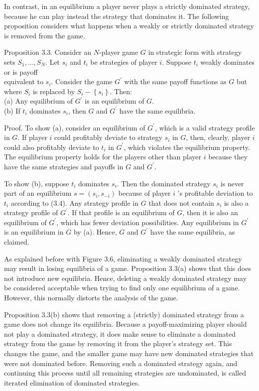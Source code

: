 \documentclass[12pt]{article}
\begin{document}
In contrast, in an equilibrium a player never plays a strictly dominated strategy, because he can play instead the strategy that dominates it. The following proposition considers what happens when a weakly or strictly dominated strategy is removed from the game.

Proposition 3.3. Consider an $N$-player game $G$ in strategic form with strategy sets $S_{1}, \ldots, S_{N}$. Let $s_{i}$ and $t_{i}$ be strategies of player $i$. Suppose $t_{i}$ weakly dominates or is payoff\\
equivalent to $s_{i}$. Consider the game $G^{\prime}$ with the same payoff functions as $G$ but where $S_{i}$ is replaced by $S_{i}-\left\{s_{i}\right\}$. Then:\\
(a) Any equilibrium of $G^{\prime}$ is an equilibrium of $G$.\\
(b) If $t_{i}$ dominates $s_{i}$, then $G$ and $G^{\prime}$ have the same equilibria.

Proof. To show (a), consider an equilibrium of $G^{\prime}$, which is a valid strategy profile in $G$. If player $i$ could profitably deviate to strategy $s_{i}$ in $G$, then, clearly, player $i$ could also profitably deviate to $t_{i}$ in $G^{\prime}$, which violates the equilibrium property. The equilibrium property holds for the players other than player $i$ because they have the same strategies and payoffs in $G$ and $G^{\prime}$.

To show (b), suppose $t_{i}$ dominates $s_{i}$. Then the dominated strategy $s_{i}$ is never part of an equilibrium $s=\left(s_{i}, s_{-i}\right)$ because of player $i$ 's profitable deviation to $t_{i}$ according to (3.4). Any strategy profile in $G$ that does not contain $s_{i}$ is also a strategy profile of $G^{\prime}$. If that profile is an equilibrium of $G$, then it is also an equilibrium of $G^{\prime}$, which has fewer deviation possibilities. Any equilibrium in $G^{\prime}$ is an equilibrium in $G$ by (a). Hence, $G$ and $G^{\prime}$ have the same equilibria, as claimed.

As explained before with Figure 3.6, eliminating a weakly dominated strategy may result in losing equilibria of a game. Proposition 3.3(a) shows that this does not introduce new equilibria. Hence, deleting a weakly dominated strategy may be considered acceptable when trying to find only one equilibrium of a game. However, this normally distorts the analysis of the game.

Proposition 3.3(b) shows that removing a (strictly) dominated strategy from a game does not change its equilibria. Because a payoff-maximizing player should not play a dominated strategy, it does make sense to eliminate a dominated strategy from the game by removing it from the player's strategy set. This changes the game, and the smaller game may have new dominated strategies that were not dominated before. Removing such a dominated strategy again, and continuing this process until all remaining strategies are undominated, is called iterated elimination of dominated strategies.
\end{document}
